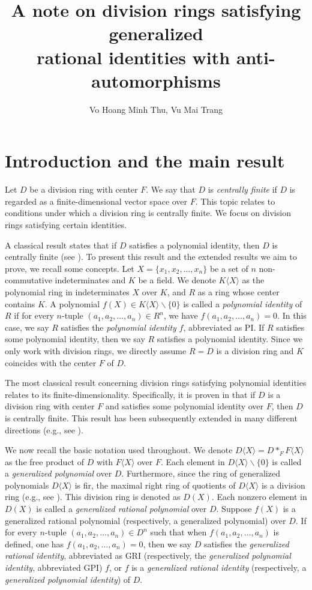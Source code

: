 \documentclass{cimart}
\title [A note on division rings satisfying generalized rational identities with anti-automorphisms]{A note on division rings satisfying generalized\\ rational identities with anti-automorphisms}
\author{%
    Vo Hoang Minh Thu, Vu Mai Trang
    }
\begin{document}
	\section{Introduction and the main result} 

Let $D$ be a division ring with center $F$. We say that $D$ is \textit{centrally finite} if $D$ is regarded as a finite-dimensional vector space over $F$. This topic relates to conditions under which a division ring is centrally finite. We focus on division rings satisfying certain identities.


A classical result states that if $D$ satisfies a polynomial identity, then $D$ is centrally finite (see \cite{i}). To present this result and the extended results we aim to prove, we recall some concepts. Let $X=\{x_1,x_2,\dots, x_n\}$ be a set of $n$ non-commutative indeterminates and $K$ be a field. We denote $K\langle X\rangle$ as the polynomial ring in indeterminates $X$ over $K$, and $R$ as a ring whose center contains $K$. A polynomial $f(X)\in K\langle X\rangle \backslash \{0\}$ is called a \textit{polynomial identity} of $R$ if for every $n$-tuple $(a_1,a_2,\dots, a_n)\in R^n$, we have $f(a_1,a_2,\dots,a_n)=0$. In this case, we say $R$ satisfies the \textit{polynomial identity} $f$, abbreviated as PI. If $R$ satisfies some polynomial identity, then we say $R$ satisfies a polynomial identity. Since we only work with division rings, we directly assume $R=D$ is a division ring and $K$ coincides with the center $F$ of $D$.


The most classical result concerning division rings satisfying polynomial identities relates to its finite-dimensionality. Specifically, it is proven in \cite{i} that if $D$ is a division ring with center $F$ and satisfies some polynomial identity over $F$, then $D$ is centrally finite. This result has been subsequently extended in many different directions (e.g., see \cite{s, s1, k, ber1, ber2, chiba, khar, w, w2, j}). 

We now recall the basic notation used throughout. We denote $D\langle X\rangle=D*_F F\langle X\rangle$ as the free product of $D$ with $F\langle X\rangle$ over $F$. Each element in $D\langle X\rangle\backslash \{0\}$ is called a \textit{generalized polynomial} over $D$. Furthermore, since the ring of generalized polynomials $D\langle X\rangle$ is fir, the maximal right ring of quotients of $D\langle X\rangle$ is a division ring (e.g., see \cite{p}). This division ring is denoted as $D(X)$. Each nonzero element in $D(X)$ is called a \textit{generalized rational polynomial} over $D$. Suppose $f(X)$ is a generalized rational polynomial (respectively, a generalized polynomial) over $D$. If for every $n$-tuple $(a_1,a_2,\dots,a_n)\in D^n$ such that when $f(a_1,a_2,\dots,a_n)$ is defined, one has $f(a_1,a_2,\dots,a_n)=0$, then we say $D$ satisfies the \textit{generalized rational identity}, abbreviated as GRI (respectively, the \textit{generalized polynomial identity}, abbreviated GPI) $f$, or $f$ is a \textit{generalized rational  identity} (respectively, a \textit{generalized polynomial identity}) of $D$.
\end{document}

